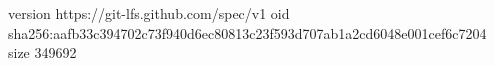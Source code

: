 version https://git-lfs.github.com/spec/v1
oid sha256:aafb33c394702c73f940d6ec80813c23f593d707ab1a2cd6048e001cef6c7204
size 349692

